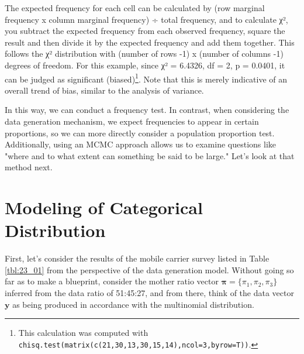 \documentclass{ltjsbook}
\begin{document}


The expected frequency for each cell can be calculated by (row marginal frequency x column marginal frequency) ÷ total frequency, and to calculate χ², you subtract the expected frequency from each observed frequency, square the result and then divide it by the expected frequency and add them together. This follows the χ² distribution with (number of rows -1) x (number of columns -1) degrees of freedom. For this example, since χ² = 6.4326, df = 2, p = 0.0401, it can be judged as significant (biased)\footnote{This calculation was computed with \verb|chisq.test(matrix(c(21,30,13,30,15,14),ncol=3,byrow=T))|.}. Note that this is merely indicative of an overall trend of bias, similar to the analysis of variance.

In this way, we can conduct a frequency test. In contrast, when considering the data generation mechanism, we expect frequencies to appear in certain proportions, so we can more directly consider a population proportion test. Additionally, using an MCMC approach allows us to examine questions like "where and to what extent can something be said to be large." Let's look at that method next.

\section{Modeling of Categorical Distribution}
First, let's consider the results of the mobile carrier survey listed in Table \ref{tbl:23_01} from the perspective of the data generation model.
Without going so far as to make a blueprint, consider the mother ratio vector $\bm{\pi} = \{ \pi_1,\pi_2,\pi_3 \}$ inferred from the data ratio of 51:45:27, and from there, think of the data vector $\bm{y}$ as being produced in accordance with the multinomial distribution.
\end{document}
